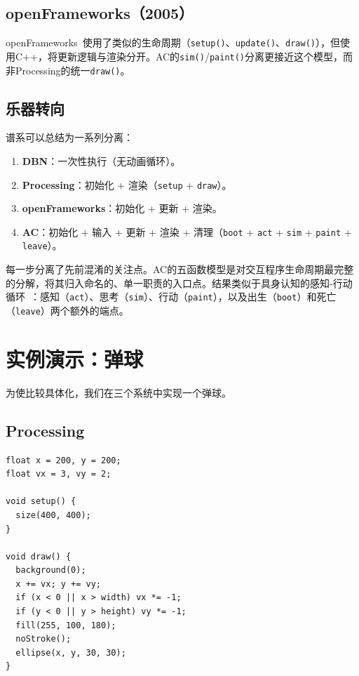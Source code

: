 \documentclass[10pt,letterpaper,twocolumn]{article}
\begin{document}
\subsection{openFrameworks（2005）}

openFrameworks~\citep{openframeworks2005}使用了类似的生命周期（\texttt{setup()}、\texttt{update()}、\texttt{draw()}），但使用C++，将更新逻辑与渲染分开。AC的\texttt{sim()}/\texttt{paint()}分离更接近这个模型，而非Processing的统一\texttt{draw()}。

\subsection{乐器转向}

谱系可以总结为一系列分离：

\begin{enumerate}
  \item \textbf{DBN}：一次性执行（无动画循环）。
  \item \textbf{Processing}：初始化 + 渲染（\texttt{setup} + \texttt{draw}）。
  \item \textbf{openFrameworks}：初始化 + 更新 + 渲染。
  \item \textbf{AC}：初始化 + 输入 + 更新 + 渲染 + 清理（\texttt{boot} + \texttt{act} + \texttt{sim} + \texttt{paint} + \texttt{leave}）。
\end{enumerate}

每一步分离了先前混淆的关注点。AC的五函数模型是对交互程序生命周期最完整的分解，将其归入命名的、单一职责的入口点。结果类似于具身认知的感知-行动循环~\citep{varela1991embodied}：感知（\texttt{act}）、思考（\texttt{sim}）、行动（\texttt{paint}），以及出生（\texttt{boot}）和死亡（\texttt{leave}）两个额外的端点。


\section{实例演示：弹球}
\label{sec:example}

为使比较具体化，我们在三个系统中实现一个弹球。

\subsection{Processing}

\begin{lstlisting}[style=processingstyle]
float x = 200, y = 200;
float vx = 3, vy = 2;

void setup() {
  size(400, 400);
}

void draw() {
  background(0);
  x += vx; y += vy;
  if (x < 0 || x > width) vx *= -1;
  if (y < 0 || y > height) vy *= -1;
  fill(255, 100, 180);
  noStroke();
  ellipse(x, y, 30, 30);
}
\end{lstlisting}
\end{document}
